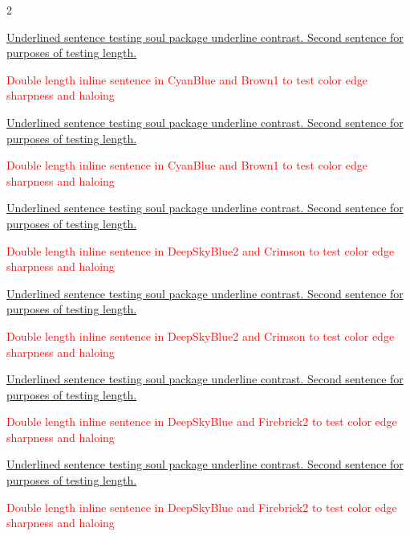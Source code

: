 \begin{multicols}{2}
\par\noindent\ul{Underlined sentence testing soul package underline contrast. Second sentence for purposes of testing length.}
\par\noindent\textcolor{Red}{Double length inline sentence in CyanBlue and Brown1 to test color edge sharpness and haloing}
\clearpage
{}
\par\noindent\ul{Underlined sentence testing soul package underline contrast. Second sentence for purposes of testing length.}
\par\noindent\textcolor{Red}{Double length inline sentence in CyanBlue and Brown1 to test color edge sharpness and haloing}
\clearpage
{}
\par\noindent\ul{Underlined sentence testing soul package underline contrast. Second sentence for purposes of testing length.}
\par\noindent\textcolor{Red}{Double length inline sentence in DeepSkyBlue2 and Crimson to test color edge sharpness and haloing}
\clearpage
{}
\par\noindent\ul{Underlined sentence testing soul package underline contrast. Second sentence for purposes of testing length.}
\par\noindent\textcolor{Red}{Double length inline sentence in DeepSkyBlue2 and Crimson to test color edge sharpness and haloing}
\clearpage
{}
\par\noindent\ul{Underlined sentence testing soul package underline contrast. Second sentence for purposes of testing length.}
\par\noindent\textcolor{Red}{Double length inline sentence in DeepSkyBlue and Firebrick2 to test color edge sharpness and haloing}
\clearpage
{}
\par\noindent\ul{Underlined sentence testing soul package underline contrast. Second sentence for purposes of testing length.}
\par\noindent\textcolor{Red}{Double length inline sentence in DeepSkyBlue and Firebrick2 to test color edge sharpness and haloing}

\end{multicols}
